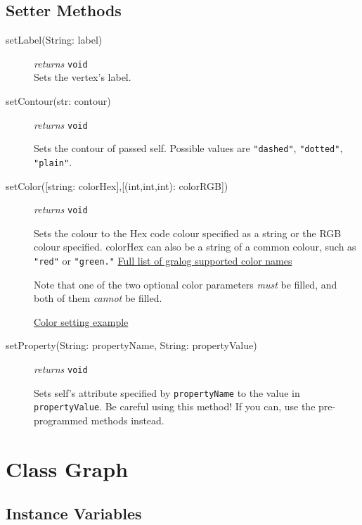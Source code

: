 \documentclass{article}
\newcounter{example}
\begin{document}
\subsection{Setter Methods}
\begin{description}
\item[setLabel(String: label)]\emph{returns}
  \texttt{void}\\
Sets the vertex's label.

\item[setContour(str: contour)] \emph{returns}
\texttt{void}

Sets the contour of passed self. Possible values are
\texttt{"dashed"}, \texttt{"dotted"}, \texttt{"plain"}.

\item[setColor({[string: colorHex]},{[(int,int,int): colorRGB]})]\emph{returns}
  \texttt{void}

Sets the colour to the Hex code colour
specified as a string or the RGB colour specified. colorHex can also be
a string of a common colour, such as \texttt{"red"} or
\texttt{"green."} \hyperref[colorNamesSupportedByGralog]{Full list of gralog supported color names}

Note that one of the two optional color parameters \textit{must} be filled, and both of them \textit{cannot} be filled.

\hyperref[colorNamesSupportedByGralog]{Color setting example}

\item[setProperty(String: propertyName, String: propertyValue)] \emph{returns} \texttt{void}

Sets self's attribute specified by \texttt{propertyName} to the value in \texttt{propertyValue}. Be careful using this method! If you can, use the pre-programmed methods instead.
\end{description}
\section{Class Graph}

\subsection{Instance Variables}
\end{document}
